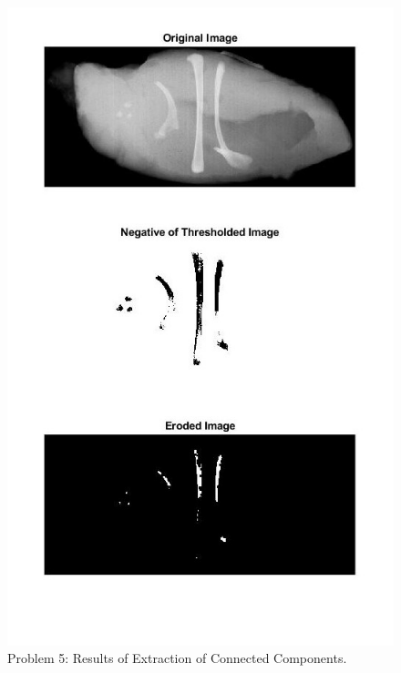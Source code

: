 \documentclass[./rarnold_project_89.tex]{subfiles}
\begin{document}
	\begin{figure}[!htbp]
	\centering
	\includegraphics[scale=0.90]{"problem5"}
	\captionsetup{justification=centering}
	\caption{Problem 5: Results of Extraction of Connected Components.} 
	\label{p5}
	\end{figure}
	
	\clearpage
	
\end{document}
